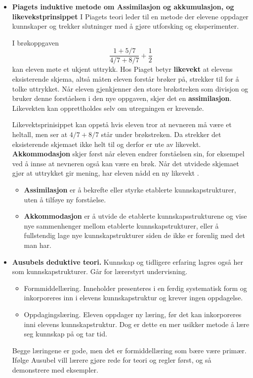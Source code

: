 \documentclass[12pt,a4paper]{article}
\begin{document}
    
     \begin{itemize}
         \item \textbf{ Piagets induktive metode om Assimilasjon og akkumulasjon, og likevekstprinsippet} 
    I Piagets teori leder til en metode der elevene oppdager kunnskaper og trekker slutninger med å gjøre utforsking og eksperimenter.

    I brøkoppgaven \[ \frac{1+5/7}{4/7+8/7}+\frac12
    \] kan eleven møte et ukjent uttrykk. Hos Piaget betyr \textbf{likevekt} at elevens eksisterende skjema, altså måten eleven forstår brøker på, strekker til for å tolke uttrykket. Når eleven
    gjenkjenner den store brøkstreken som divisjon og bruker denne forståelsen i den nye oppgaven, skjer det en \textbf{assimilasjon}. Likevekten kan opprettholdes selv om utregningen er krevende.  

Likevektsprinisippet kan oppstå hvis eleven tror at nevneren må være et heltall, men ser at \(4/7+8/7\) står under brøkstreken. Da strekker det eksisterende skjemaet ikke helt til og derfor er ute av likevekt. \textbf{Akkommodasjon}  skjer først når eleven endrer forståelsen sin, for eksempel ved å innse at nevneren også kan være en brøk. Når det utvidede skjemaet gjør at uttrykket gir mening, har eleven nådd en ny likevekt \cite[p. 53]{skaalvik2021skolen}.
\begin{itemize}
    \item \textbf{Assimilasjon} er å bekrefte eller styrke etablerte kunnskapstrukturer, uten å tilføye ny forståelse.
    \item \textbf{Akkommodasjon} er å utvide de etablerte kunnskapsstrukturene og vise nye sammenhenger mellom etablerte kunnskapstrukturer, eller å fullstendig lage nye kunnskapstrukturer siden de ikke er forenlig med det man har.   
\end{itemize}

\item \textbf{ Ausubels deduktive teori. } Kunnskap og tidligere erfaring lagres også her som kunnskapstrukturer.  Går for lærerstyrt undervisning.   
    \begin{itemize}
        \item Formmiddellæring. Inneholder presenteres i en ferdig systematisk form og inkorporeres inn i elevens kunnskapstruktur og krever ingen oppdagelse. 

        \item Oppdagingslæring. Eleven oppdager ny læring, før det kan inkorporeres inni elevens kunnskapstruktur. Dog er dette en mer usikker metode å lære seg kunnskap på og tar tid.    
    \end{itemize}
    Begge læringene er gode, men det er formiddellæring som bære være primær. Ifølge Ausubel vill lærere gjøre rede for teori og regler først, og så demonstrere med eksempler.


\end{itemize}
\end{document}
